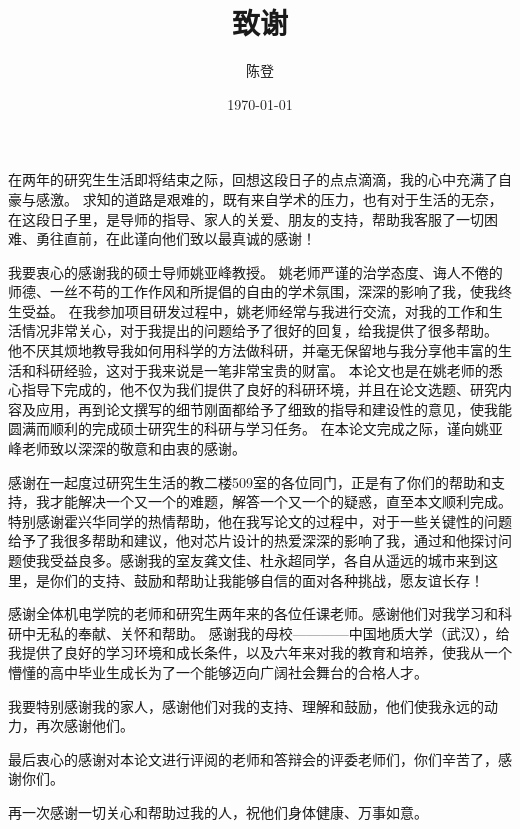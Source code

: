\documentclass[UTF8]{ctexart}
\title{致谢}
\author{陈登}
\date{\today}
\begin{document}
在两年的研究生生活即将结束之际，回想这段日子的点点滴滴，我的心中充满了自豪与感激。
求知的道路是艰难的，既有来自学术的压力，也有对于生活的无奈，在这段日子里，是导师的指导、家人的关爱、朋友的支持，帮助我客服了一切困难、勇往直前，在此谨向他们致以最真诚的感谢！

我要衷心的感谢我的硕士导师姚亚峰教授。
姚老师严谨的治学态度、诲人不倦的师德、一丝不苟的工作作风和所提倡的自由的学术氛围，深深的影响了我，使我终生受益。
在我参加项目研发过程中，姚老师经常与我进行交流，对我的工作和生活情况非常关心，对于我提出的问题给予了很好的回复，给我提供了很多帮助。
他不厌其烦地教导我如何用科学的方法做科研，并毫无保留地与我分享他丰富的生活和科研经验，这对于我来说是一笔非常宝贵的财富。
本论文也是在姚老师的悉心指导下完成的，他不仅为我们提供了良好的科研环境，并且在论文选题、研究内容及应用，再到论文撰写的细节刚面都给予了细致的指导和建设性的意见，使我能圆满而顺利的完成硕士研究生的科研与学习任务。
在本论文完成之际，谨向姚亚峰老师致以深深的敬意和由衷的感谢。

感谢在一起度过研究生生活的教二楼509室的各位同门，正是有了你们的帮助和支持，我才能解决一个又一个的难题，解答一个又一个的疑惑，直至本文顺利完成。
特别感谢霍兴华同学的热情帮助，他在我写论文的过程中，对于一些关键性的问题给予了我很多帮助和建议，他对芯片设计的热爱深深的影响了我，通过和他探讨问题使我受益良多。感谢我的室友龚文佳、杜永超同学，各自从遥远的城市来到这里，是你们的支持、鼓励和帮助让我能够自信的面对各种挑战，愿友谊长存！

感谢全体机电学院的老师和研究生两年来的各位任课老师。感谢他们对我学习和科研中无私的奉献、关怀和帮助。
感谢我的母校————中国地质大学（武汉），给我提供了良好的学习环境和成长条件，以及六年来对我的教育和培养，使我从一个懵懂的高中毕业生成长为了一个能够迈向广阔社会舞台的合格人才。

我要特别感谢我的家人，感谢他们对我的支持、理解和鼓励，他们使我永远的动力，再次感谢他们。

最后衷心的感谢对本论文进行评阅的老师和答辩会的评委老师们，你们辛苦了，感谢你们。

再一次感谢一切关心和帮助过我的人，祝他们身体健康、万事如意。


\end{document}
